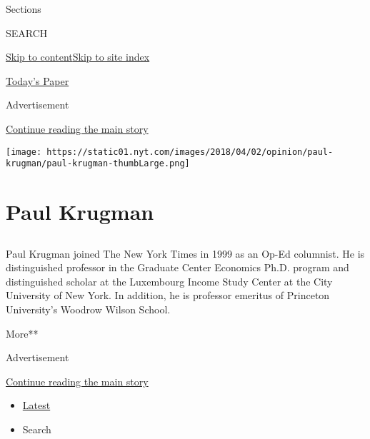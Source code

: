 Sections

SEARCH

\protect\hyperlink{site-content}{Skip to
content}\protect\hyperlink{site-index}{Skip to site index}

\href{https://myaccount.nytimes.com/auth/login?response_type=cookie\&client_id=vi}{}

\href{https://www.nytimes.com/section/todayspaper}{Today's Paper}

Advertisement

\protect\hyperlink{after-top}{Continue reading the main story}

\texttt{[image: https://static01.nyt.com/images/2018/04/02/opinion/paul-krugman/paul-krugman-thumbLarge.png]}

\hypertarget{paul-krugman}{%
\section{Paul Krugman}\label{paul-krugman}}

\subsection{}

Paul Krugman joined The New York Times in 1999 as an Op-Ed columnist. He
is distinguished professor in the Graduate Center Economics Ph.D.
program and distinguished scholar at the Luxembourg Income Study Center
at the City University of New York. In addition, he is professor
emeritus of Princeton University's Woodrow Wilson School.

More**

Advertisement

\protect\hyperlink{after-mid1}{Continue reading the main story}

\begin{itemize}
\tightlist
\item
  \protect\hyperlink{stream-panel}{Latest}
\item
  Search
\end{itemize}

